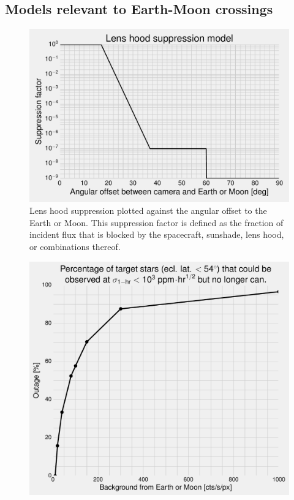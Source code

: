 \pagebreak
\begin{appendices}
	
\section{Models relevant to Earth-Moon crossings}
\label{sec:appendix}

\begin{figure}[!h] %
	\centering
	\includegraphics{figures/lens_hood_suppression.pdf}
	\caption{Lens hood suppression plotted against the angular offset to the Earth or Moon. This suppression factor is defined as the fraction of incident flux that is blocked by the spacecraft, sunshade, lens hood, or combinations thereof.}
	\label{fig:lens_hood_suppression}
\end{figure}
\newpage
\begin{figure}[!t] %
	\centering
	\includegraphics{figures/outage_vs_background.pdf}

\end{figure}
\end{appendices}
